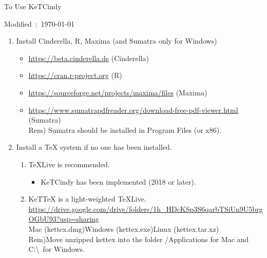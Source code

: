 \documentclass{article}
\begin{document}
\begin{center}
To Use KeTCindy 
\end{center}

\hfill Modified\ :\ \today

\begin{enumerate}[\bf\large 1.]
\item Install Cinderella, R, Maxima (and Sumatra only for Windows)
 \begin{itemize}
 \item \url{https://beta.cinderella.de}  (Cinderella)
 \item \url{https://cran.r-project.org}   (R)
 \item \url{https://sourceforge.net/projects/maxima/files}  (Maxima)
 \item \url{https://www.sumatrapdfreader.org/download-free-pdf-viewer.html} (Sumatra)\\
\hspace*{5mm}Rem) Sumatra should be installed in Program Files (or x86).
 \end{itemize}
\item Install a TeX system if no one has been installed.
 \begin{enumerate}[(1)]
 \item TeXLive is recommended.
    \begin{itemize}
    \item KeTCindy has been implemented (2018 or later).
    \end{itemize}
 \item KeTTeX is a light-weighted TeXLive.\\
\hspace*{3mm}\url{https://drive.google.com/drive/folders/1h_HDcKSp3S6qarbTSiUn9U5brgOGbU93?usp=sharing}\\
\hspace*{12mm}Mac (kettex.dmg)\hspace{3mm}Windows (kettex.exe)\hspace*{3mm}Linux (kettex.tar.xz)\\
\hspace*{3mm}Rem)Move unzipped kettex into the folder /Applications for Mac and C:\textbackslash\ for Windows.
 \end{enumerate}


\end{enumerate}
\end{document}
